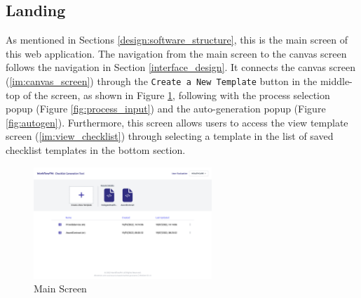 \subsection{Landing}
\label{im:landing}

As mentioned in Sections \ref{design:software_structure}, this is the main screen of this web application. The navigation from the main screen to the canvas screen follows the navigation in Section \ref{interface_design}.
It connects the canvas screen (\ref{im:canvas_screen}) through the \verb!Create a New Template! button in the middle-top of the screen, as shown in Figure \ref{fig:main_screen}, following with the process selection popup (Figure \ref{fig:process_input}) and the auto-generation popup (Figure \ref{fig:autogen}).
Furthermore, this screen allows users to access the view template screen (\ref{im:view_checklist}) through selecting a template in the list of saved checklist templates in the bottom section.

\begin{figure}[ht!]
    \centering
    \includegraphics[width=0.6\textwidth]{overleaf/images/screens/main_screen.png}
    \caption{Main Screen}
    \label{fig:main_screen}
\end{figure}


